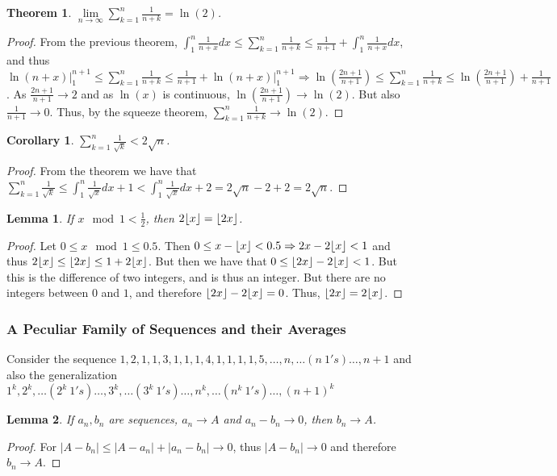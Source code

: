 \documentclass[12pt,oneside]{book}
\theoremstyle{mystyle}
\newtheorem{theorem}{Theorem}[section]
\newtheorem{lemma}{Lemma}[section]
\newtheorem{corollary}{Corollary}[section]
\DeclarePairedDelimiter\floor{\lfloor}{\rfloor}
\begin{document}
\begin{theorem}
$\underset{n\rightarrow \infty}\lim \sum_{k=1}^{n} \frac{1}{n+k} = \ln(2)$.
\end{theorem}
\begin{proof}
From the previous theorem, $\int_{1}^{n} \frac{1}{n+x} dx \leq \sum_{k=1}^{n} \frac{1}{n+k} \leq \frac{1}{n+1} + \int_{1}^{n} \frac{1}{n+x}dx$, and thus $\ln(n+x)\big|_{1}^{n+1} \leq \sum_{k=1}^{n} \frac{1}{n+k}\leq \frac{1}{n+1}+\ln(n+x)\big|_{1}^{n+1}\Rightarrow \ln(\frac{2n+1}{n+1})\leq \sum_{k=1}^{n} \frac{1}{n+k} \leq \ln(\frac{2n+1}{n+1})+\frac{1}{n+1}$. As $\frac{2n+1}{n+1}\rightarrow 2$ and as $\ln(x)$ is continuous, $\ln(\frac{2n+1}{n+1})\rightarrow \ln(2)$. But also $\frac{1}{n+1}\rightarrow 0$. Thus, by the squeeze theorem, $\sum_{k=1}^{n} \frac{1}{n+k} \rightarrow \ln(2)$.
\end{proof}

\begin{corollary}
$\sum_{k=1}^{n}\frac{1}{\sqrt{k}}< 2\sqrt{n}$.
\end{corollary}
\begin{proof}
From the theorem we have that $\sum_{k=1}^{n} \frac{1}{\sqrt{k}} \leq \int_{1}^{n}\frac{1}{\sqrt{x}}dx + 1 < \int_{1}^{n} \frac{1}{\sqrt{x}}dx +2 = 2\sqrt{n}-2+2 = 2\sqrt{n}$.
\end{proof}

\begin{lemma}
If $x\mod 1 < \frac{1}{2}$, then $2\floor{x} = \floor{2x}$.
\end{lemma}
\begin{proof}
Let $0\leq x \mod 1 \leq 0.5$. Then $0 \leq x-\floor{x}<0.5 \Rightarrow 2x-2\floor{x} <1$ and thus $2\floor{x} \leq \floor{2x} \leq 1+2\floor{x}$. But then we have that $0 \leq \floor{2x}-2\floor{x} <1$. But this is the difference of two integers, and is thus an integer. But there are no integers between $0$ and $1$, and therefore $\floor{2x}-2\floor{x} = 0$. Thus, $\floor{2x}=2\floor{x}$.
\end{proof}

\subsubsection{A Peculiar Family of Sequences and their Averages}
%
Consider the sequence $1,2,1,1,3,1,1,1,4,1,1,1,1,5,\hdots, n,\hdots (n\ 1's)\hdots, n+1$ and also the generalization $1^k, 2^k,\hdots (2^k\ 1's)\hdots, 3^k, \hdots (3^k\ 1's)\hdots, n^k, \hdots (n^k\ 1's)\hdots, (n+1)^k$
%
\begin{lemma}
If $a_n, b_n$ are sequences, $a_n\rightarrow A$ and $a_n-b_n\rightarrow 0$, then $b_n \rightarrow A$.
\end{lemma}
\begin{proof}
For $|A-b_n| \leq |A-a_n|+|a_n-b_n| \rightarrow 0$, thus $|A-b_n|\rightarrow 0$ and therefore $b_n \rightarrow A$.
\end{proof}
\end{document}
